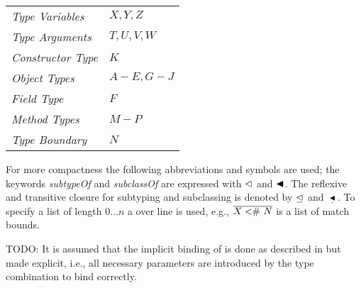 \begin{table}[H]
	\begin{tabular}{ll}
		\textit{Type Variables} & $X, Y, Z$ \\
		\textit{Type Arguments} & $T, U, V, W$ \\
		\textit{Constructor Type} & $K$ \\
		\textit{Object Types} & $A - E, G - J$ \\
		\textit{Field Type} & $F$ \\
		\textit{Method Types} & $M - P$ \\
		\textit{Type Boundary} & $N$
	\end{tabular}
\end{table}

For more compactness the following abbreviations and symbols are used; the
keywords \emph{subtypeOf} and \emph{subclassOf} are expressed with $\vartriangleleft$
and $\blacktriangleleft$. The reflexive and transitive closure for subtyping and
subclassing is denoted by $\trianglelefteq$ and $\underline{\blacktriangleleft}$.
To specify a list of length $0\ldots n$ a over line is used, e.g.,
$\overline{X <\!\!\#~ N}$ is a list of match bounds.

TODO:
It is assumed that the implicit binding of \mytype is done as described in  but made explicit, i.e., all necessary parameters are introduced by the type combination to bind \mytype correctly.


